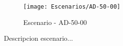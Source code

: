 \begin{figure}[H]
\centering
\texttt{[image: Escenarios/AD-50-00]}
\caption{Escenario - AD-50-00}
\label{fig:AD-50-00}
\end{figure}

Descripcion escenario...
\clearpage

